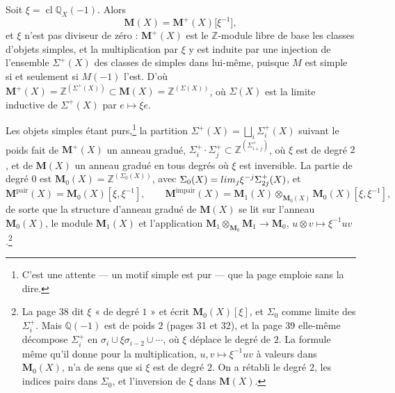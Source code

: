 \documentclass[11pt,a4paper]{article}
\begin{document}
Soit $\xi = \operatorname{cl}\mathbb{Q}_{X}(-1)$. Alors
\[
\mathbf{M}(X) = \mathbf{M}^{+}(X)\bigl[\xi^{-1}\bigr] ,
\]
et $\xi$ n'est pas diviseur de zéro : $\mathbf{M}^{+}(X)$ est le
$\mathbb{Z}$-module libre de base les classes d'objets simples, et la
multiplication par $\xi$ y est induite par une injection de l'ensemble
$\Sigma^{+}(X)$ des classes de simples dans lui-même, puisque $M$ est simple si
et seulement si $M(-1)$ l'est. D'où $\mathbf{M}^{+}(X) =
\mathbb{Z}^{(\Sigma^{+}(X))} \subset \mathbf{M}(X) = \mathbb{Z}^{(\Sigma(X))}$,
où $\Sigma(X)$ est la limite inductive de $\Sigma^{+}(X)$ par $e \mapsto \xi e$.

Les objets simples étant purs,\footnote{C'est une attente --- un motif simple
est pur --- que la page emploie sans la dire.} la partition $\Sigma^{+}(X) =
\bigsqcup_{i} \Sigma^{+}_{i}(X)$ suivant le poids fait de $\mathbf{M}^{+}(X)$ un
anneau gradué, $\Sigma^{+}_{i}\cdot\Sigma^{+}_{j} \subset
\mathbb{Z}^{(\Sigma^{+}_{i+j})}$, où $\xi$ est de degré $2$, et de $\mathbf{M}(X)$
un anneau gradué en tous degrés où $\xi$ est inversible. La partie de degré $0$
est $\mathbf{M}_{0}(X) = \mathbb{Z}^{(\Sigma_{0}(X))}$, avec $\Sigma_{0}(X) =
\varinjlim_{j} \xi^{-j}\Sigma^{+}_{2j}(X)$, et
\[
\mathbf{M}^{\mathrm{pair}}(X) = \mathbf{M}_{0}(X)[\xi, \xi^{-1}] ,
\qquad
\mathbf{M}^{\mathrm{impair}}(X) = \mathbf{M}_{1}(X) \otimes_{\mathbf{M}_{0}(X)}
\mathbf{M}_{0}(X)[\xi, \xi^{-1}] ,
\]
de sorte que la structure d'anneau gradué de $\mathbf{M}(X)$ se lit sur l'anneau
$\mathbf{M}_{0}(X)$, le module $\mathbf{M}_{1}(X)$ et l'application
$\mathbf{M}_{1} \otimes_{\mathbf{M}_{0}} \mathbf{M}_{1} \to \mathbf{M}_{0}$,
$u \otimes v \mapsto \xi^{-1}uv$.\footnote{La page 38 dit $\xi$ « de degré $1$ » et écrit
$\mathbf{M}_{0}(X)[\xi]$, et $\Sigma_{0}$ comme limite des $\Sigma^{+}_{i}$. Mais
$\mathbb{Q}(-1)$ est de poids $2$ (pages 31 et 32), et la page 39 elle-même
décompose $\Sigma^{+}_{i}$ en $\sigma_{i} \cup \xi\sigma_{i-2} \cup \cdots$, où
$\xi$ déplace le degré de $2$. La formule même qu'il donne pour la multiplication,
$u, v \mapsto \xi^{-1}uv$ à valeurs dans $\mathbf{M}_{0}(X)$, n'a de sens que si
$\xi$ est de degré $2$. On a rétabli le degré $2$, les indices pairs dans
$\Sigma_{0}$, et l'inversion de $\xi$ dans $\mathbf{M}(X)$.}
\end{document}
